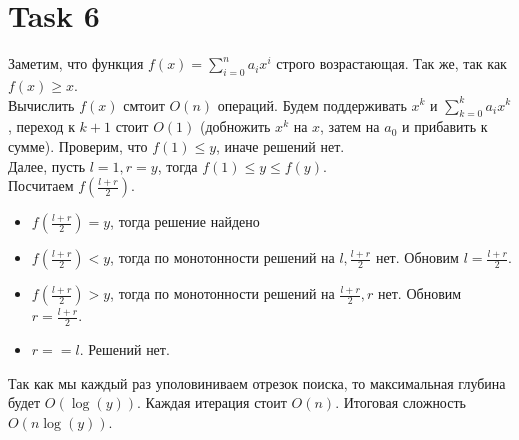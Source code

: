 \documentclass[12pt]{exam}
\begin{document}
\section*{Task 6}
Заметим, что функция $f(x) = \sum_{i=0}^n a_i x^i$ строго возрастающая. 
Так же, так как $f(x) \geq x$. \\
Вычислить $f(x)$ смтоит $O(n)$ операций. 
Будем поддерживать $x^k$ и $\sum_{k=0}^k a_i x^k$, переход к $k+1$ стоит $O(1)$ 
(добножить $x^k$ на $x$, затем на $a_0$ и прибавить к сумме).   
Проверим, что $f(1) \leq y$, иначе решений нет. \\
Далее, пусть $l = 1, r = y$, тогда $f(1) \leq y \leq f(y)$.\\
Посчитаем $f\left( \frac{l + r}{2} \right)$. \\
\begin{itemize}
    \item $f\left( \frac{l + r}{2} \right) = y$, тогда решение найдено
    \item $f\left( \frac{l + r}{2} \right) < y$, тогда по монотонности решений на $l, \frac{l + r}{2}$ нет. 
    Обновим $l = \frac{l + r}{2}$.
    \item $f\left( \frac{l + r}{2} \right) > y$, тогда по монотонности решений на $\frac{l + r}{2}, r$ нет. 
    Обновим $r = \frac{l + r}{2}$.
    \item $r == l$. Решений нет.
\end{itemize}
Так как мы каждый раз уполовиниваем отрезок поиска, то максимальная глубина будет $O(\log(y))$. 
Каждая итерация стоит $O(n)$. Итоговая сложность $O(n \log(y))$.
\end{document}
